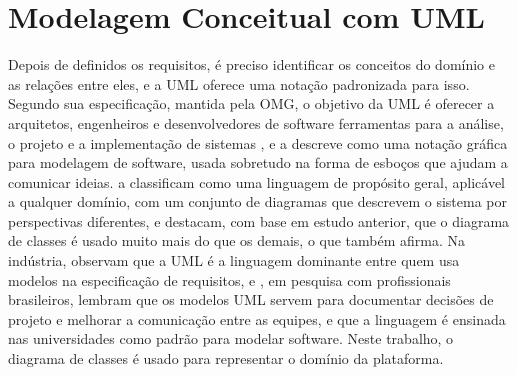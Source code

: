 \section{Modelagem Conceitual com UML}
\label{sec:modelagem-conceitual}

Depois de definidos os requisitos, é preciso identificar os conceitos do domínio e as relações entre eles, e a UML oferece uma notação padronizada para isso.
Segundo sua especificação, mantida pela OMG, o objetivo da UML é oferecer a arquitetos, engenheiros e desenvolvedores de software ferramentas para a análise, o
projeto e a implementação de sistemas \cite{OMG2017uml}, e  a descreve como uma notação gráfica para modelagem de
software, usada sobretudo na forma de esboços que ajudam a comunicar ideias.  a classificam como uma linguagem de propósito
geral, aplicável a qualquer domínio, com um conjunto de diagramas que descrevem o sistema por perspectivas diferentes, e destacam, com base em estudo anterior,
que o diagrama de classes é usado muito mais do que os demais, o que  também afirma. Na indústria, 
observam que a UML é a linguagem dominante entre quem usa modelos na especificação de requisitos, e , em pesquisa com
profissionais brasileiros, lembram que os modelos UML servem para documentar decisões de projeto e melhorar a comunicação entre as equipes, e que a linguagem é
ensinada nas universidades como padrão para modelar software. Neste trabalho, o diagrama de classes é usado para representar o
domínio da plataforma.

